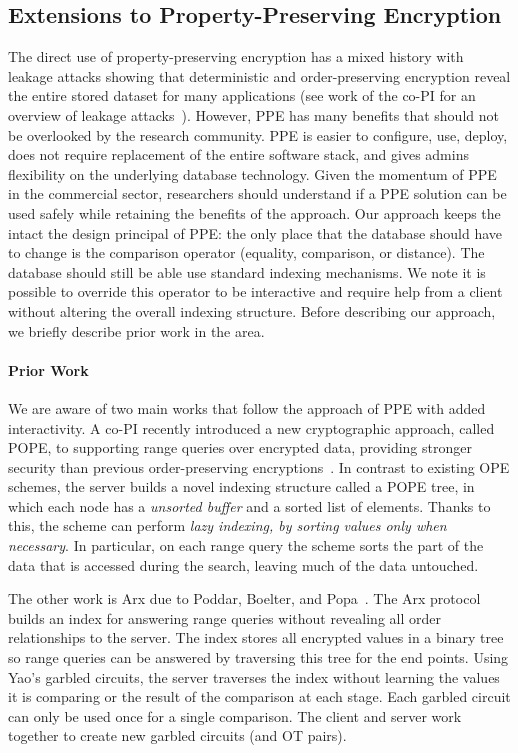 
\subsection{Extensions to Property-Preserving Encryption}
The direct use of property-preserving encryption has a mixed history with leakage attacks showing that deterministic and order-preserving encryption reveal the entire stored dataset for many applications (see work of the co-PI for an overview of leakage attacks~\cite{SP:FVYSHG17}).  However, PPE has many benefits that should not be overlooked by the research community.  PPE is easier to configure, use, deploy, does not require replacement of the entire software stack, and gives admins flexibility on the underlying database technology.  Given the momentum of PPE in the commercial sector, researchers should understand if a PPE solution can be used safely while retaining the benefits of the approach.  Our approach keeps the intact the design principal of PPE: the only place that the database should have to change is the comparison operator (equality, comparison, or distance).  The database should still be able use standard indexing mechanisms.  We note it is possible to override this operator to be interactive and require help from a client without altering the overall indexing structure.  Before describing our approach, we briefly describe prior work in the area.

\paragraph{Prior Work}
We are aware of two main works that follow the approach of PPE with added interactivity.  A co-PI recently introduced a new cryptographic approach, called POPE, to
supporting range queries over encrypted data, providing stronger security than
previous order-preserving encryptions~\cite{CCS:RACY16}.  In contrast to
existing OPE schemes, the server builds a novel indexing structure called a
POPE tree, in which each node has a {\it unsorted buffer} and a sorted list of
elements.  Thanks to this, the scheme can perform {\it lazy indexing, by
sorting values only when necessary}. In particular, on each range query the
scheme sorts the part of the data that is accessed during the search, leaving
much of the data untouched.

The other work is Arx due to Poddar, Boelter, and Popa~\cite{EPRINT:PodBoePop16}.  The
Arx protocol builds an index for answering
range queries without revealing all order relationships to the
server. The index stores all encrypted values in a binary
tree so range queries can be answered by traversing this
tree for the end points. Using Yao's garbled circuits, the
server traverses the index without learning the values it is
comparing or the result of the comparison at each stage.  Each garbled circuit can only be used once for a single comparison.  The client and server work together to create new garbled circuits (and OT pairs).

